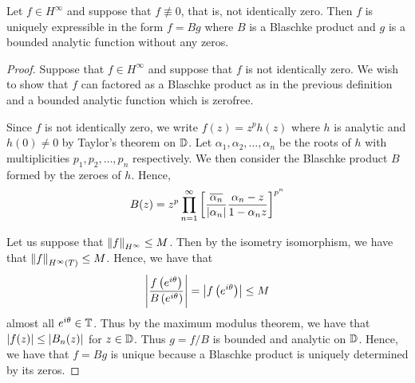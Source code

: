 \begin{theorem}
    Let $f \in H^{\infty}$ and suppose that $f\not \equiv 0$, that is, not identically zero.  Then $f$ is uniquely expressible in the form $f=Bg$ where $B$ is a Blaschke product and $g$ is a bounded analytic function without any zeros.
    \label{thm:factor-bounded-function}
\end{theorem}
\begin{proof}
    Suppose that $f\in H^{\infty}$ and suppose that $f$ is not identically zero.  We wish to show that $f$ can factored as a Blaschke product as in the previous definition and a bounded analytic function which is zerofree.

    Since $f$ is not identically zero, we write $f(z)= z^{p} h(z)$ where $h$ is analytic and $h(0)\ne 0$ by Taylor's theorem on $\mathbb D$. Let $\alpha_{1}, \alpha_{2}, \ldots , \alpha_{n}$ be the roots of $h$ with multiplicities $p_{1}, p_{2}, \ldots, p_{n}$ respectively. We then consider the Blaschke product $B$ formed by the zeroes of $h$. Hence, 
    \begin{equation*}
	B(z)= z^{p} \prod_{n=1}^{\infty} \left[ \frac{\overline{\alpha_{n}}}{\left\lvert \alpha_{n} \right\rvert} \frac{\alpha_{n} -z}{1-\alpha_{n}z} \right]^{p^{n}}
    \end{equation*}
    
    Let us suppose that $\left\lVert f \right\rVert_{H^{\infty}} \le M$. Then by the isometry isomorphism, we have that $\left\lVert f \right\rVert_{H^{\infty} \left( T \right)} \le M$. Hence, we have that 
    \begin{equation*}
	\left\lvert \frac{f\left( e^{i\theta} \right)}{B\left( e^{i\theta} \right)} \right\rvert = \left\lvert f\left( e^{i\theta} \right) \right\rvert\le M
    \end{equation*}
    almost all $e^{i\theta} \in \mathbb T$.
    Thus by the maximum modulus theorem, we have that $\left\lvert f(z) \right\rvert \le \left\lvert B_{n}(z) \right\rvert$ for $z\in \mathbb D$. Thus $g=f/B$ is bounded and analytic on $\mathbb D$. Hence, we have that $f=Bg$ is unique because a Blaschke product is uniquely determined by its zeros.
\end{proof}

